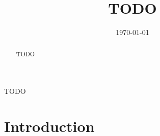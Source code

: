 \documentclass[11pt, oneside]{amsart}
\title{TODO}
\date{\today}
\begin{document}
\maketitle
\begin{abstract}
	TODO
\end{abstract}
\begin{abstractZH}
	TODO
\end{abstractZH}


\section*{Introduction}\label{sec:intro}
\begingroup
  \renewcommand{\thetheorem}{(\Alph{theorem})}
  
\endgroup

\appendix


\printbibliography
\end{document}
